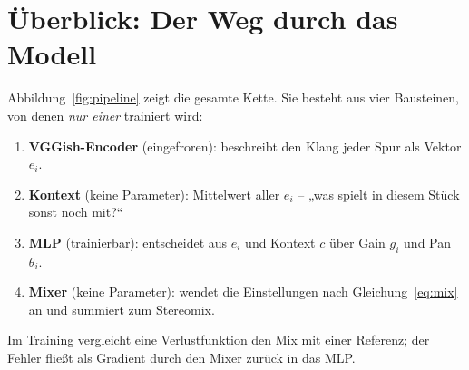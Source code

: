 \documentclass[11pt,a4paper]{article}
\begin{document}
\section{Überblick: Der Weg durch das Modell}

Abbildung~\ref{fig:pipeline} zeigt die gesamte Kette. Sie besteht aus vier
Bausteinen, von denen \emph{nur einer} trainiert wird:

\begin{enumerate}[nosep]
  \item \textbf{VGGish-Encoder} (eingefroren): beschreibt den Klang jeder Spur
    als Vektor $e_i$.
  \item \textbf{Kontext} (keine Parameter): Mittelwert aller $e_i$ -- „was
    spielt in diesem Stück sonst noch mit?“
  \item \textbf{MLP} (trainierbar): entscheidet aus $e_i$ und Kontext $c$
    über Gain $g_i$ und Pan $\theta_i$.
  \item \textbf{Mixer} (keine Parameter): wendet die Einstellungen nach
    Gleichung~\eqref{eq:mix} an und summiert zum Stereomix.
\end{enumerate}
Im Training vergleicht eine Verlustfunktion den Mix mit einer Referenz; der
Fehler fließt als Gradient durch den Mixer zurück in das MLP.
\end{document}
